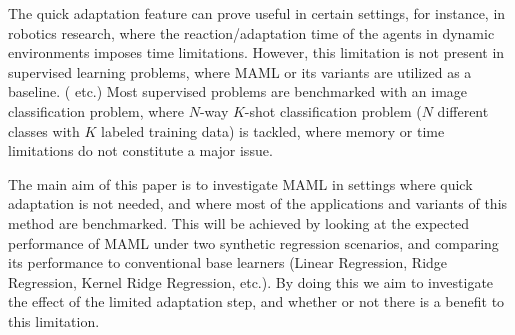 The quick adaptation feature can prove useful in certain settings, for instance, in robotics research, where the reaction/adaptation time of the agents in dynamic environments imposes time limitations. However, this limitation is not present in supervised learning problems, where MAML or its variants are utilized as a baseline. (\eg \cite{flennerhag2019,nichol2018,rajasegaran2020,collins2020,guiroy2019} etc.) Most supervised problems are benchmarked with an image classification problem, where $N$-way $K$-shot classification problem ($N$ different classes with $K$ labeled training data) is tackled, where memory or time limitations do not constitute a major issue.

The main aim of this paper is to investigate MAML in settings where quick adaptation is not needed, and where most of the applications and variants of this method are benchmarked. This will be achieved by looking at the expected performance of MAML under two synthetic regression scenarios, and comparing its performance to conventional base learners (\eg Linear Regression, Ridge Regression, Kernel Ridge Regression, etc.). By doing this we aim to investigate the effect of the limited adaptation step, and whether or not there is a benefit to this limitation. %


